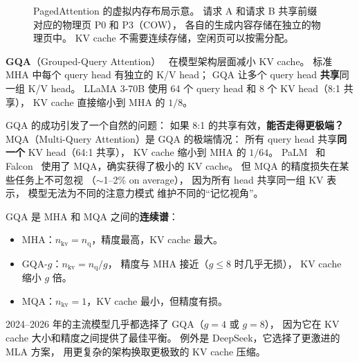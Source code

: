 \begin{figure}[ht]
\caption{PagedAttention 的虚拟内存布局示意。
请求 A 和请求 B 共享前缀对应的物理页 P0 和 P3（COW），
各自的生成内容存储在独立的物理页中。
KV cache 不需要连续存储，空闲页可以按需分配。}
\label{fig:paged-attention}
\end{figure}

\textbf{GQA}（Grouped-Query Attention）~\cite{ainslie2023gqa}
在模型架构层面减小 KV cache。
标准 MHA 中每个 query head 有独立的 K/V head；
GQA 让多个 query head \textbf{共享}同一组 K/V head。
LLaMA 3-70B 使用 64 个 query head 和 8 个 KV head（8:1 共享），
KV cache 直接缩小到 MHA 的 $1/8$。

GQA 的成功引发了一个自然的问题：
如果 8:1 的共享有效，\textbf{能否走得更极端？}
MQA（Multi-Query Attention）是 GQA 的极端情况：
所有 query head 共享\textbf{同一个} KV head（64:1 共享），
KV cache 缩小到 MHA 的 $1/64$。
PaLM~\cite{chowdhery2022palm} 和 Falcon~\cite{penedo2023refinedweb}
使用了 MQA，确实获得了极小的 KV cache。
但 MQA 的精度损失在某些任务上不可忽视
（$\sim$1--2\% on average），
因为所有 head 共享同一组 KV 表示，
模型无法为不同的注意力模式
维护不同的“记忆视角”。

GQA 是 MHA 和 MQA 之间的\textbf{连续谱}：
\begin{itemize}[noitemsep]
  \item MHA：$n_{\text{kv}} = n_{\text{q}}$，精度最高，KV cache 最大。
  \item GQA-$g$：$n_{\text{kv}} = n_{\text{q}} / g$，
        精度与 MHA 接近（$g \leq 8$ 时几乎无损），
        KV cache 缩小 $g$ 倍。
  \item MQA：$n_{\text{kv}} = 1$，KV cache 最小，但精度有损。
\end{itemize}
2024--2026 年的主流模型几乎都选择了 GQA（$g = 4$ 或 $g = 8$），
因为它在 KV cache 大小和精度之间提供了最佳平衡。
例外是 DeepSeek，它选择了更激进的 MLA 方案，
用更复杂的架构换取更极致的 KV cache 压缩。

